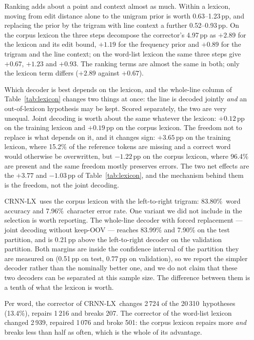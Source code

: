 \documentclass{ws-ijprai}
\newcommand{\ours}{CRNN-LX}            %
\newcommand{\ourwa}{83.80\%}
\newcommand{\ourcer}{7.96\%}
\newcommand{\nsamples}{20\,310}
\begin{document}
Ranking adds about a point and context almost as much. Within a lexicon,
moving from edit distance alone to the unigram prior is worth
0.63--1.23\,pp,
and replacing the prior by the trigram with line context a further
0.52--0.93\,pp.
On the corpus lexicon the three steps decompose the corrector's
4.97\,pp as
$+2.89$ for the lexicon
and its edit bound, $+1.19$
for the frequency prior and
$+0.89$
for the trigram and the line context; on the word-list lexicon the same three
steps give $+0.67$,
$+1.23$ and
$+0.93$.
The ranking terms are almost the same in both; only the lexicon term differs
($+2.89$ against $+0.67$).

Which decoder is best depends on the lexicon, and the whole-line column of
Table~\ref{tab:lexicon} changes two things at once: the line is decoded
jointly \emph{and} an out-of-lexicon hypothesis may be kept. Scored
separately, the two are very unequal. Joint decoding is worth about the same
whatever the lexicon: $+0.12$\,pp on the training lexicon and $+0.19$\,pp on
the corpus lexicon. The freedom not to replace is what depends on it, and it
changes sign: $+3.65$\,pp on the training lexicon, where 15.2\% of the
reference tokens are missing and a correct word would otherwise be
overwritten, but $-1.22$\,pp on the corpus lexicon, where 96.4\% are present
and the same freedom mostly preserves errors. The two net effects are the
$+3.77$ and $-1.03$\,pp of Table~\ref{tab:lexicon}, and the mechanism behind
them is the freedom, not the joint decoding.

\ours\ uses the corpus lexicon with the left-to-right trigram: \ourwa\ word
accuracy and \ourcer\ character error rate. One variant we did not include in
the selection is worth reporting. The whole-line decoder with forced
replacement --- joint decoding without keep-OOV --- reaches 83.99\% and
7.90\% on the test partition, and is 0.21\,pp above the left-to-right decoder
on the validation partition. Both margins are inside the confidence interval
of the partition they are measured on (0.51\,pp on test, 0.77\,pp on
validation), so we report the simpler decoder rather than the nominally
better one, and we do not claim that these two decoders can be separated at
this sample size. The difference between them is a tenth of what the lexicon
is worth.

Per word, the corrector of \ours\ changes 2\,724 of the
\nsamples\ hypotheses (13.4\%), repairs 1\,216
and breaks 207. The corrector of the word-list lexicon changed
2\,939, repaired 1\,076 and broke
501: the corpus lexicon repairs more \emph{and} breaks
less than half as often, which is the whole of its advantage.
\end{document}
